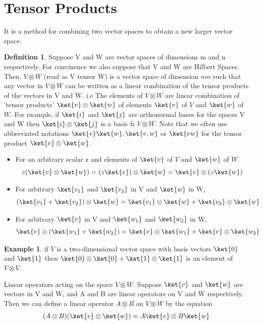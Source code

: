\documentclass[12pt, oneside]{book}
\theoremstyle{definition}
\newtheorem{definition}{Definition}[section]
\theoremstyle{definition}
\newtheorem{example}{Example}[section]
\theoremstyle{remark}
\begin{document}
\section{Tensor Products}
It is a method for combining two vector spaces to obtain a new larger vector space. 
\begin{definition}
    Suppose V and W are vector spaces of dimensions m and n respectively. For convinence we also suppose that V and W are Hilbert Spaces. Then,
    $V \otimes W$ (read as V tensor W) is a vector space of dimension $mn$ such that any vector in $V \otimes W$ can be written as a linear combination of the tensor products of the vectors in V and W. i.e 
    The elements of $V \otimes W$ are linear combination of 'tensor products' $\ket{v} \otimes \ket{w}$ of elements $\ket{v}$ of $V$ and $\ket{w}$ of $W$. For example, if $\ket{i}$ and 
    $\ket{j}$ are orthonormal bases for the spaces V and W then $\ket{i} \otimes \ket{j}$ is a basis fr $V \otimes W$. Note that we often use abbreviated notations $\ket{v}\ket{w},\ket{v,w}$ 
    or $\ket{vw}$ for the tensor product $\ket{v} \otimes \ket{w}$. 
    \begin{itemize}
        \item For an arbitrary scalar z and elements of $\ket{v}$ of $V$ and $\ket{w}$ of $W$.
        \[ z(\ket{v} \otimes \ket{w}) = (z\ket{v}) \otimes \ket{w} = \ket{v} \otimes (z\ket{w}) \]
        \item For arbitrary $\ket{v_1}$ and $\ket{v_2}$ in V and $\ket{w}$ in W,
        \[ (\ket{v_1}+\ket{v_2}) \otimes \ket{w} = \ket{v_1} \otimes \ket{w} + \ket{v_2} \otimes \ket{w} \]
        \item For arbitrary $\ket{v}$ in V and $\ket{w_1}$ and $\ket{w_2}$ in W,
        \[ \ket{v} \otimes (\ket{w_1}+\ket{w_2}) = \ket{v} \otimes \ket{w_1} + \ket{v} \otimes \ket{w_2} \]
    \end{itemize}
\end{definition}

\begin{example}
    if $V$ is a two-dimensional vector space with basis vectors $\ket{0}$ and $\ket{1}$ then $\ket{0} \otimes \ket{0} + \ket{1} \otimes \ket{1}$ is an element of 
    $V \otimes V$.
\end{example}

Linear operators acting on the space $V\otimes W$. Suppose $\ket{v}$ and $\ket{w}$ are vectors in V and W, and A and B are linear operators 
on V and W respectively. Then we can define a linear operator $A \otimes B$ on $V \otimes W$ by the equation
\[ (A \otimes B)(\ket{v} \otimes \ket{w}) = A\ket{v} \otimes B\ket{w} \]
\end{document}
